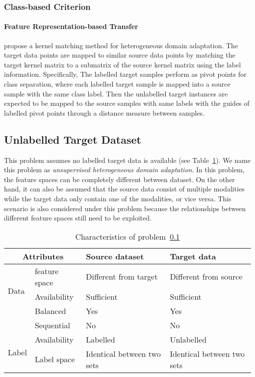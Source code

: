 \documentclass[prodmode]{acmsmall}  %
\begin{document}
\subsubsection{Class-based Criterion}
\paragraph{Feature Representation-based Transfer} 
 propose a kernel matching method for heterogeneous domain adaptation. The target data points are mapped to similar source data points by matching the target kernel matrix to a submatrix of the source kernel matrix using the label information. Specifically,
The labelled target samples perform as pivot points for class separation, where each labelled target sample is mapped into a source sample with the same class label. Then the unlabelled target instances are expected to be mapped to the source samples with same labels with the guides of labelled pivot points through a distance measure between samples. 

\subsection{Unlabelled Target Dataset}
\label{sec:HETESunsup}
This problem assumes no labelled target data is available (see Table~\ref{tab:HETESunsup}). We name this problem as \textit{unsupervised heterogeneous domain adaptation}. In this problem, the feature spaces can be completely different between dataset. On the other hand, it can also be assumed that the source data consist of multiple modalities while the target data only contain one of the modalities, or vice versa. This scenario is also considered under this problem because the relationships between different feature spaces still need to be exploited.
\begin{table}[htbp!]
\caption{Characteristics of problem~\ref{sec:HETESunsup}}
\label{tab:HETESunsup}
\begin{center}
\begin{small}
\begin{tabular}{|p{1cm}<{\centering}|m{2.5cm}<{\centering}|m{4.3cm}<{\centering}|m{4.3cm}<{\centering}|}
\hline
\multicolumn{2}{|c|}{Attributes} & Source dataset & Target data \\
\hline \hline
\multirow{3}{*}{Data} & feature space & Different from target & {\color{red}Different from source} \\ 
\cline{2-4}{} & Availability & Sufficient & Sufficient \\
\cline{2-4}{} & Balanced & Yes & Yes \\
\cline{2-4}{} & Sequential & No & No \\
\hline \hline
\multirow{2}{*}{Label} & Availability & Labelled & {\color{red}Unlabelled} \\
\cline{2-4}{}  & Label space & Identical between two sets  & Identical between two sets \\ 
\cline{2-4}
\hline
\end{tabular}
\end{small}
\end{center}
\end{table}
\end{document}
